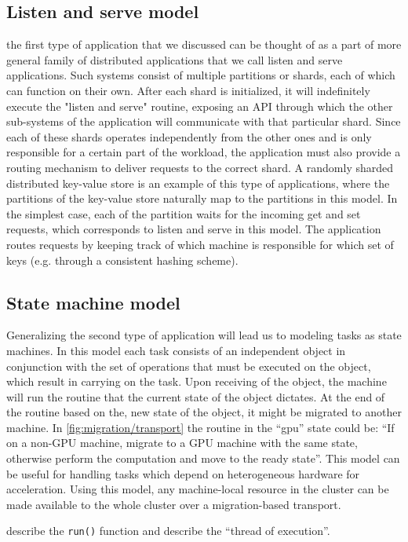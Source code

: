 \subsection{Listen and serve model}
the first type of application that we discussed can be thought of as a
part of more general family of distributed applications that we call
listen and serve applications.
Such systems consist of multiple partitions or shards, each
of which can function on their own. After each shard is initialized, it
will indefinitely execute the "listen and serve" routine,
exposing an API through which the other sub-systems of the application
will communicate with that particular shard. Since each of these shards
operates independently from the other ones and is only
responsible for a certain part of the workload, the application
must also provide a routing mechanism to
deliver requests to the correct shard. A randomly sharded distributed
key-value store is an example of this type of applications, where the
partitions of the key-value store naturally map to the partitions in this
model. In the simplest case, each of the partition waits for the incoming
get and set requests, which corresponds to listen and serve in this model.
The application routes requests by keeping track of which machine
is responsible for which set of keys (e.g. through a consistent hashing
scheme).

\subsection{State machine model}
Generalizing the second type of application will lead us to modeling
tasks as state machines. In this model each task consists of an
independent object in conjunction with the set of operations that must be
executed on the object, which result in carrying on the task. Upon
receiving of the object, the machine will run the routine that the current
state of the object dictates. At the end of the routine based on the, new
state of the object, it might be migrated to another machine. In
\ref{fig:migration/transport} the routine in the ``gpu'' state could be:
``If on a non-GPU machine, migrate to a GPU machine with the same state,
otherwise perform the computation and move to the ready state''. This
model can be useful for handling tasks which depend on heterogeneous
hardware for acceleration. Using this model, any machine-local
resource in the cluster can be made available to the whole cluster over
a migration-based transport.

describe the \texttt{run()} function and describe the ``thread of execution''.

